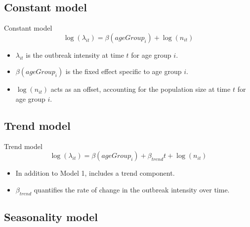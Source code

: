 \documentclass[aspectratio=169]{beamer}
\begin{document}
\hypertarget{constant-model}{%
\subsection{Constant model}\label{constant-model}}

\begin{frame}{Constant model}
\begin{equation}\label{eq:Agegroup}
  \log(\lambda_{it}) = \beta(ageGroup_{i}) + \log(n_{it})
\end{equation}

\begin{itemize}
  \item $\lambda_{it}$ is the outbreak intensity at time $t$ for age group $i$.
  \item $\beta(ageGroup_{i})$ is the fixed effect specific to age group $i$.
  \item $\log(n_{it})$ acts as an offset, accounting for the population size at time $t$ for age group $i$.
\end{itemize}
\end{frame}

\hypertarget{trend-model}{%
\subsection{Trend model}\label{trend-model}}

\begin{frame}{Trend model}
\begin{equation}
  \log(\lambda_{it})=\beta(ageGroup_{i}) + \beta_{trend} t + \log(n_{it})
\end{equation}

\begin{itemize}
  \item In addition to Model 1, includes a trend component.
  \item $\beta_{trend}$ quantifies the rate of change in the outbreak intensity over time.
\end{itemize}
\end{frame}

\hypertarget{seasonality-model}{%
\subsection{Seasonality model}\label{seasonality-model}}
\end{document}
